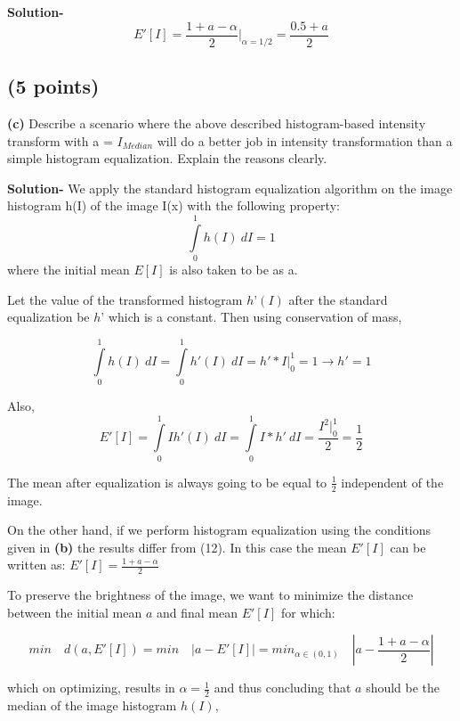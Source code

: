 \documentclass{article}
\begin{document}
\textbf{Solution-}
\begin{equation}E'[I] = \frac{1+a-\alpha}{2}|_{\alpha=1/2} = \frac{0.5+a}{2}\end{equation}

\subsection{(5 points)}
\textbf{(c)} Describe a scenario where the above described histogram-based intensity
transform with a = $I_{Median}$ will do a better job in intensity transformation
than a simple histogram equalization. Explain the reasons clearly.

\textbf{Solution-}
We apply the standard histogram equalization algorithm on the image
histogram h(I) of the image I(x) with the following property:
\begin{equation}\int\limits_0^1 h(I)\ dI = 1\end{equation}
where the initial mean $E[I]$ is also taken to be as a. 

Let the value of the transformed histogram $h’(I)$ after the standard equalization be $h’$ which is a constant.
Then using conservation of mass,

\begin{equation}\int\limits_0^1 h(I)\ dI = \int\limits_0^1 h'(I)\ dI = h'*I|_0^1 = 1 \rightarrow h' = 1\end{equation}

Also,
\begin{equation}E'[I] = \int\limits_0^1 I h'(I)\ dI = \int\limits_0^1 I*h'\ dI =\frac{I^2|_0^1}{2}=\frac{1}{2}\end{equation}

The mean after equalization is always going to be equal to $\frac{1}{2}$ independent of the image.

On the other hand, if we perform histogram equalization using the
conditions given in \textbf{(b)} the results differ from (12). In this case the mean
$E'[I]$ can be written as: $E'[I] = \frac{1+a-\alpha}{2}\ $

To preserve the brightness of the image, we want to minimize the distance between the initial mean $a$ and final mean $E'[I]$ for which:

\begin{equation}min\quad d(a,E'[I]) = min\quad|a-E'[I]| = min_{\alpha\in(0,1)} \quad|a-\frac{1+a-\alpha}{2}|\end{equation}

which on optimizing, results in $ \alpha = \frac{1}{2}$ and thus concluding that $a $ should
be the median of the image histogram $h(I)$,
\end{document}
